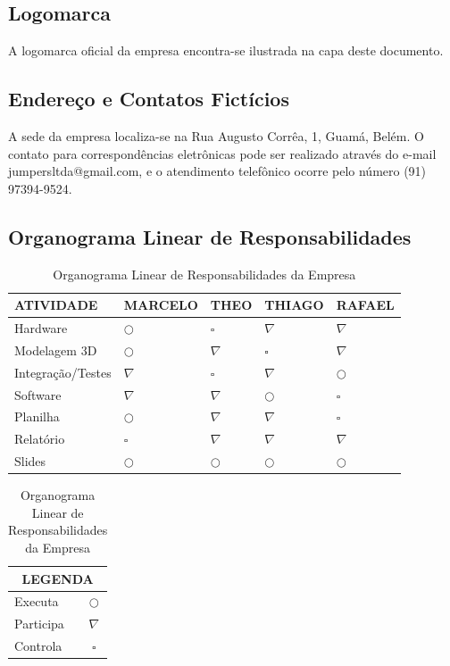 \documentclass[12pt, a4paper]{article}
\begin{document}
\subsection{Logomarca}
A logomarca oficial da empresa encontra-se ilustrada na capa deste documento.

\subsection{Endereço e Contatos Fictícios}
A sede da empresa localiza-se na Rua Augusto Corrêa, 1, Guamá, Belém. O contato para correspondências eletrônicas pode ser realizado através do e-mail jumpersltda@gmail.com, e o atendimento telefônico ocorre pelo número (91) 97394-9524.

\subsection{Organograma Linear de Responsabilidades}

\vspace{0.5cm}
\begin{table}[h]
\centering
\begin{tabularx}{\textwidth}{|l|>{\centering\arraybackslash}X|>{\centering\arraybackslash}X|>{\centering\arraybackslash}X|>{\centering\arraybackslash}X|}
\hline
\textbf{ATIVIDADE} & \textbf{MARCELO} & \textbf{THEO} & \textbf{THIAGO} & \textbf{RAFAEL} \\ \hline
Hardware            & $\bigcirc$ & $\square$  & $\nabla$   & $\nabla$  \\ \hline
Modelagem 3D        & $\bigcirc$   & $\nabla$   & $\square$  & $\nabla$  \\ \hline
Integração/Testes   & $\nabla$   & $\square$ & $\nabla$   & $\bigcirc$  \\ \hline
Software            & $\nabla$   & $\nabla$   & $\bigcirc$ & $\square$ \\ \hline
Planilha            & $\bigcirc$   & $\nabla$   & $\nabla$   & $\square$ \\ \hline
Relatório           & $\square$  & $\nabla$   & $\nabla$   & $\nabla$ \\ \hline
Slides              & $\bigcirc$   & $\bigcirc$   & $\bigcirc$   & $\bigcirc$  \\ \hline
\end{tabularx}

\vspace{0.5cm}

\begin{tabular}{|l|c|}
\hline
\multicolumn{2}{|c|}{\textbf{LEGENDA}} \\ \hline
Executa   & $\bigcirc$  \\ \hline
Participa & $\nabla$    \\ \hline
Controla  & $\square$   \\ \hline
\end{tabular}

\caption{Organograma Linear de Responsabilidades da Empresa}
\label{tab:matriz_responsabilidades}
\end{table}
\end{document}
